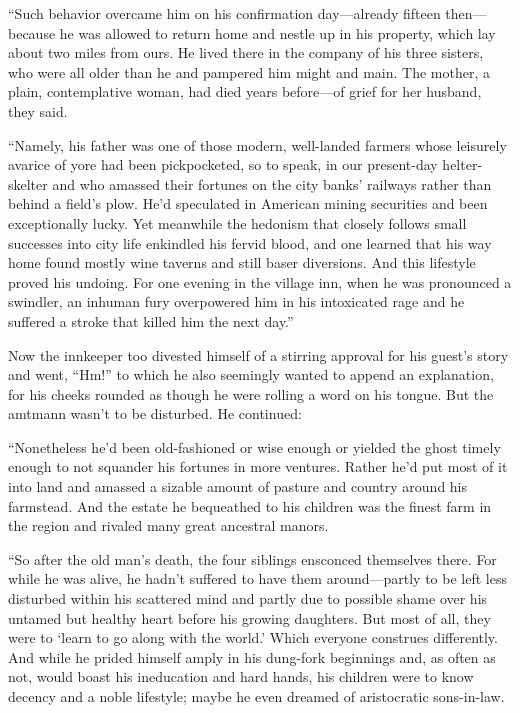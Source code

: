 \documentclass[12pt,a4paper]{article}
\begin{document}
“Such behavior overcame him on his confirmation day—already fifteen then—because he was allowed to return home and nestle up in his property, which lay about two miles from ours. He lived there in the company of his three sisters, who were all older than he and pampered him might and main. The mother, a plain, contemplative woman, had died years before—of grief for her husband, they said.

“Namely, his father was one of those modern, well-landed farmers whose leisurely avarice of yore had been pickpocketed, so to speak, in our present-day helter-skelter and who amassed their fortunes on the city banks’ railways rather than behind a field’s plow. He’d speculated in American mining securities and been exceptionally lucky. Yet meanwhile the hedonism that closely follows small successes into city life enkindled his fervid blood, and one learned that his way home found mostly wine taverns and still baser diversions. And this lifestyle proved his undoing. For one evening in the village inn, when he was pronounced a swindler, an inhuman fury overpowered him in his intoxicated rage and he suffered a stroke that killed him the next day.”

Now the innkeeper too divested himself of a stirring approval for his guest’s story and went, “Hm!” to which he also seemingly wanted to append an explanation, for his cheeks rounded as though he were rolling a word on his tongue. But the amtmann wasn’t to be disturbed. He continued:

“Nonetheless he’d been old-fashioned or wise enough or yielded the ghost timely enough to not squander his fortunes in more ventures. Rather he’d put most of it into land and amassed a sizable amount of pasture and country around his farmstead. And the estate he bequeathed to his children was the finest farm in the region and rivaled many great ancestral manors.

“So after the old man’s death, the four siblings ensconced themselves there. For while he was alive, he hadn’t suffered to have them around—partly to be left less disturbed within his scattered mind and partly due to possible shame over his untamed but healthy heart before his growing daughters. But most of all, they were to ‘learn to go along with the world.’ Which everyone construes differently. And while he prided himself amply in his dung-fork beginnings and, as often as not, would boast his ineducation and hard hands, his children were to know decency and a noble lifestyle; maybe he even dreamed of aristocratic sons-in-law.
\end{document}
